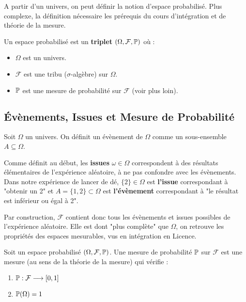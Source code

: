 A partir d'un univers, on peut définir la notion d'espace probabilisé. Plus complexe, la définition nécessaire les prérequis 
du cours d'intégration et de théorie de la mesure. 

\begin{definition}
    Un espace probabilisé est un \textbf{triplet} $ (\Omega, \mathcal{F}, \mathbb{P})$ où :
    \begin{itemize}
        \item $\Omega$ est un univers. 
        \item $ \mathcal{F}$ est une tribu ($\sigma$-algèbre) sur $ \Omega$. 
        \item $ \mathbb{P}$ est une mesure de probabilité sur $ \mathcal{F}$ (voir plus loin). 
    \end{itemize}
\end{definition}



\subsection{Évènements, Issues et Mesure de Probabilité }

\begin{definition}[Évènement]
    Soit $\Omega$ un univers. On définit un évènement de $\Omega$ comme un sous-ensemble $A \subseteq \Omega$. 
\end{definition}

\begin{remark}
    Comme définit au début, les \textbf{issues} $ \omega \in \Omega$ correspondent à des résultats élémentaires de l'expérience 
    aléatoire, à ne pas confondre avec les évènements. 
    Dans notre expérience de lancer de dé, $\{2\} \in \Omega$ est \textbf{l'issue} correspondant à "obtenir un 2" et 
    $A = \{1,2\} \subset \Omega$ est \textbf{l'évènement} correspondant à "le résultat est inférieur ou égal à 2". 
\end{remark}

Par construction, $ \mathcal{F}$ contient donc tous les évènements et issues possibles de l'expérience aléatoire. 
Elle est dont "plus complète" que $\Omega$, on retrouve les propriétés des espaces mesurables, vus en intégration en Licence. 

\begin{definition}
    Soit un espace probabilisé $(\Omega, \mathcal{F}, \mathbb{P})$. Une mesure de probabilité $ \mathbb{P}$ 
    sur $ \mathcal{F}$ est une mesure (au sens de la théorie de la mesure) qui vérifie : 
    \begin{enumerate}
        \item $ \mathbb{P} : \mathcal{F} \longrightarrow [0,1]$
        \item $ \mathbb{P}(\Omega) = 1$ 
    \end{enumerate}
\end{definition}

